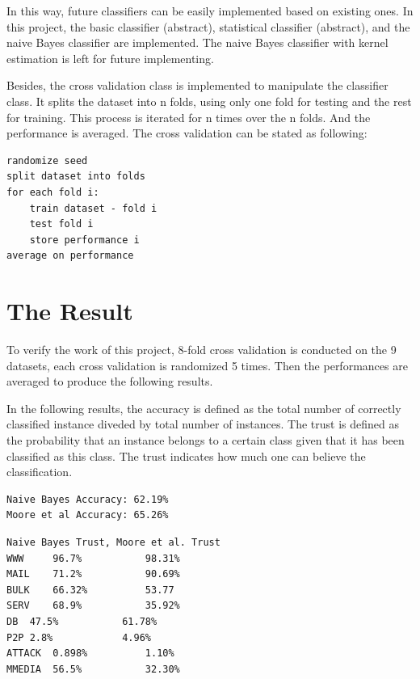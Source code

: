 \documentclass[a4paper,12pt]{article}
\begin{document}
In this way, future classifiers can be easily implemented based on existing ones. In this project, the basic classifier (abstract), statistical classifier (abstract), and the naive Bayes classifier are implemented. The naive Bayes classifier with kernel estimation is left for future implementing.

Besides, the cross validation class is implemented to manipulate the classifier class. It splits the dataset into n folds, using only one fold for testing and the rest for training. This process is iterated for n times over the n folds. And the performance is averaged. The cross validation can be stated as following:

\singlespacing
\begin{verbatim}
randomize seed 
split dataset into folds
for each fold i:
    train dataset - fold i 
    test fold i
    store performance i 
average on performance
\end{verbatim}
\doublespacing

\section{The Result}
\label{sec:result}
To verify the work of this project, 8-fold cross validation is conducted on the 9 datasets, each cross validation is randomized 5 times. Then the performances are averaged to produce the following results.

In the following results, the accuracy is defined as the total number of correctly classified instance diveded by total number of instances. The trust is defined as the probability that an instance belongs to a certain class given that it has been classified as this class. The trust indicates how much one can believe the classification.

\singlespacing
\begin{verbatim}
Naive Bayes Accuracy: 62.19%
Moore et al Accuracy: 65.26%
\end{verbatim}

\begin{verbatim}
Naive Bayes Trust, Moore et al. Trust
WWW 	96.7%			98.31%
MAIL	71.2%			90.69%
BULK	66.32%			53.77
SERV	68.9%			35.92%
DB	47.5%			61.78%
P2P	2.8%			4.96%
ATTACK	0.898%			1.10%
MMEDIA	56.5%			32.30%
\end{verbatim}
\doublespacing
\end{document}
